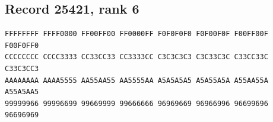 \documentclass[11pt]{amsart}
\theoremstyle{definition}
\theoremstyle{remark}
\numberwithin{equation}{section}
\numberwithin{table}{section}
\begin{document}
\subsection*{Record 25421, rank 6}
\begin{Verbatim}[fontsize=\scriptsize,xleftmargin=1em]
FFFFFFFF FFFF0000 FF00FF00 FF0000FF F0F0F0F0 F0F00F0F F00FF00F F00F0FF0
CCCCCCCC CCCC3333 CC33CC33 CC3333CC C3C3C3C3 C3C33C3C C33CC33C C33C3CC3
AAAAAAAA AAAA5555 AA55AA55 AA5555AA A5A5A5A5 A5A55A5A A55AA55A A55A5AA5
99999966 99996699 99669999 99666666 96969669 96966996 96699696 96696969
\end{Verbatim}
\par
{}\par
\end{document}
